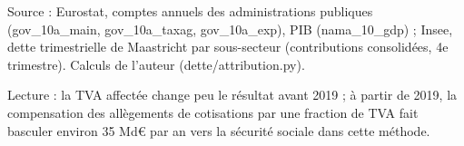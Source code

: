 Source : Eurostat, comptes annuels des administrations publiques (gov\_10a\_main, gov\_10a\_taxag, gov\_10a\_exp), PIB (nama\_10\_gdp) ; Insee, dette trimestrielle de Maastricht par sous-secteur (contributions consolidées, 4e trimestre). Calculs de l'auteur (dette/attribution.py).\par Lecture : la TVA affectée change peu le résultat avant 2019 ; à partir de 2019, la compensation des allègements de cotisations par une fraction de TVA fait basculer environ 35 Md\euro{} par an vers la sécurité sociale dans cette méthode.
